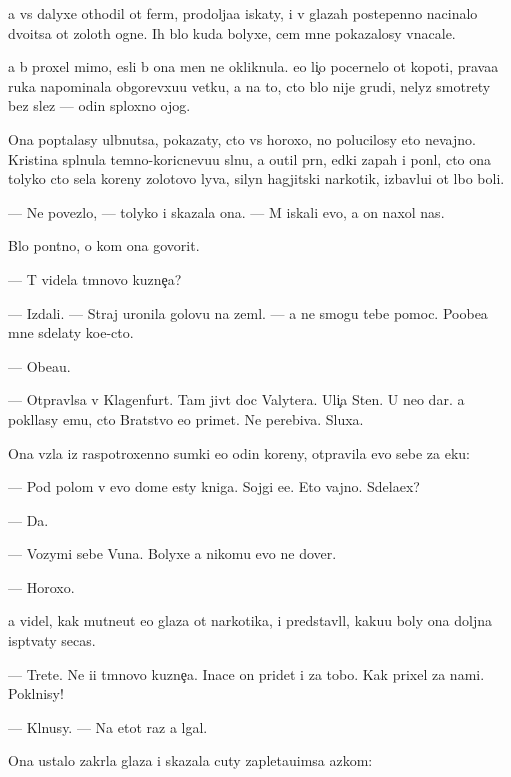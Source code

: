 \documentclass[10pt]{book}
\begin{document}
{\Y}a vs{\e} dalyxe othodil ot ferm{\yi}, prodolja{\y}a iskaty, i v glazah postepenno nacinalo dvo{\y}itsa ot zolot{\yi}h ogne{\y}. Ih b{\yi}lo kuda bolyxe, cem mne pokazalosy vnacale.

{\Y}a b{\yi} proxel mimo, {\y}esli b{\yi} ona men{\ia} ne okliknula. {\y}e{\y}o li{\c}o pocernelo ot kopoti, prava{\y}a ruka napominala obgorevxu{\y}u vetku, a na to, cto b{\yi}lo nije grudi, nelyz{\ia} smotrety bez slez — odin sploxno{\y} ojog.

Ona pop{\yi}talasy ul{\yi}bnutsa, pokazaty, cto vs{\e} horoxo, no polucilosy eto nevajno. Kristina spl{\iu}nula temno-koricnevu{\y}u sl{\iu}nu, {\y}a o{\x}util pr{\ia}n{\yi}{\y}, {\y}edki{\y} zapah i pon{\ia}l, cto ona tolyko cto s{\y}ela koreny zolotovo lyva, silyn{\yi}{\y} hagjitski{\y} narkotik, izbavl{\ia}{\y}u{\x}i{\y} ot l{\iu}bo{\y} boli.

— Ne povezlo, — tolyko i skazala ona. — M{\yi} iskali {\y}evo, a on naxol nas.

B{\yi}lo pon{\ia}tno, o kom ona govorit.

— T{\yi} videla t{\e}mnovo kuzne{\c}a?

— Izdali. — Straj uronila golovu na zeml{\iu}. — {\Y}a ne smogu tebe pomoc. Poobe{\x}a{\y} mne sdelaty ko{\y}e-cto.

— Obe{\x}a{\y}u.

— Otpravl{\ia}{\y}sa v Klagenfurt. Tam jiv{\e}t doc Valytera. Uli{\c}a Sten{\yi}. U ne{\y}o dar. {\Y}a pokl{\ia}lasy {\y}emu, cto Bratstvo {\y}e{\y}o primet. Ne perebiva{\y}. Sluxa{\y}.

Ona vz{\ia}la iz raspotroxenno{\y} sumki {\y}e{\x}o odin koreny, otpravila {\y}evo sebe za {\x}eku:

— Pod polom v {\y}evo dome {\y}esty kniga. Sojgi {\y}e{\y}e. Eto vajno. Sdela{\y}ex?

— Da.

— Vozymi sebe V{\y}una. Bolyxe {\y}a nikomu {\y}evo ne dover{\iu}.

— Horoxo.

{\Y}a videl, kak mutne{\y}ut {\y}e{\y}o glaza ot narkotika, i predstavl{\ia}l, kaku{\y}u boly ona doljna isp{\yi}t{\yi}vaty se{\y}cas.

— Tret{\y}e. Ne i{\x}i t{\e}mnovo kuzne{\c}a. Inace on pridet i za tobo{\y}. Kak prixel za nami. Pokl{\ia}nisy!

— Kl{\ia}nusy. — Na etot raz {\y}a lgal.

Ona ustalo zakr{\yi}la glaza i skazala cuty zapleta{\y}u{\x}imsa {\y}az{\yi}kom:
\end{document}
